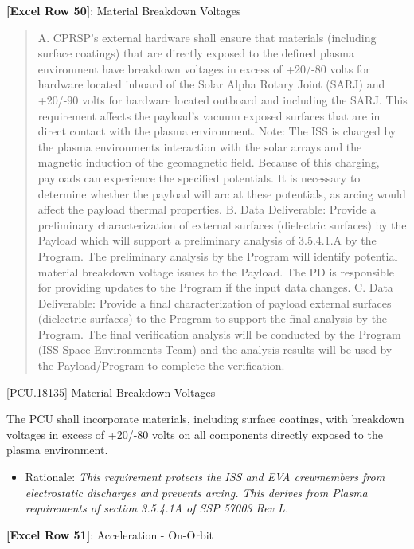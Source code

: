 \textbf{[Excel Row 50]}: Material Breakdown Voltages

\begin{quote}
A. CPRSP's external hardware shall ensure that materials (including surface coatings) that are directly exposed to the defined plasma environment have breakdown voltages in excess of +20\slash -80 volts for hardware located inboard of the Solar Alpha Rotary Joint (SARJ) and +20\slash -90 volts for hardware located outboard and including the SARJ. This requirement affects the payload’s vacuum exposed surfaces that are in direct contact with
the plasma environment.
Note: The ISS is charged by the plasma environments interaction with the solar arrays and the magnetic induction of the geomagnetic field. Because of this charging, payloads can experience the specified potentials. It is necessary to determine whether the payload will arc at these potentials, as arcing would affect the payload thermal properties.
B. Data Deliverable: Provide a preliminary characterization of external surfaces (dielectric surfaces) by the Payload which will support a preliminary analysis of 3.5.4.1.A by the Program. The preliminary analysis by the Program will identify potential material breakdown voltage issues to the Payload. The PD is responsible for providing updates to the Program if the input data changes.
C. Data Deliverable: Provide a final characterization of payload external surfaces (dielectric surfaces) to the Program to support the final analysis by the Program. The final verification analysis will be conducted by the Program (ISS Space Environments Team) and the analysis results will be used by the Payload\slash Program to complete the verification.
\end{quote}

[PCU.18135] Material Breakdown Voltages

The PCU shall incorporate materials, including surface coatings, with breakdown voltages in excess of +20\slash -80 volts on all components directly exposed to the plasma environment.

\begin{itemize}
\item{} Rationale: \emph{This requirement protects the ISS and EVA crewmembers from electrostatic discharges and prevents arcing. This derives from Plasma requirements of section 3.5.4.1A of SSP 57003 Rev L.}

\end{itemize}

\textbf{[Excel Row 51]}: Acceleration - On-Orbit

